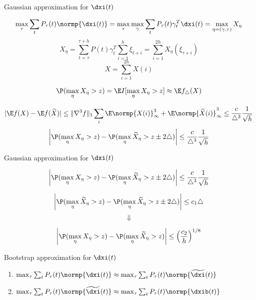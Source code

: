 \documentclass[9pt,english]{beamer}   %
\begin{document}
\begin{frame}{Gaussian approximation for $\dxi(t)$}

\[
\max_\tau \sum_t P_\tau(t)  \normp{\dxi(t)}  =
\max_\tau \max_{\gamma} \sum_t P_\tau(t) \gamma_t^{T}  \dxi(t) 
 = \max_{\eta = (\gamma, \tau)} X_{\eta} 
\]
\[
 X_{\eta}  = \sum_{t = \tau}^{\tau + h} P(t) \gamma_t^{T} \sum_{i = 1}^{ h} \xi_{t+i}
   = \sum_{i = 1}^{2h} X_{\eta}(\xi_{\tau +  i})   
\]
\[
X = \sum_{i = 1}^{2h} X(i)
\]

\[
\P (\max_{\eta} X_{\eta} > z) = \E I [ \max_{\eta} X_{\eta} > z ] 
\approx
 \E f_{\triangle} (X)
\]

\[
| \E f(X) - \E f(\widetilde{X}) | \leq  \| \nabla^3 f \|_1 \sum_i \E \normp{X(i)}^3_{\infty} + \E \normp{\widetilde{X}(i)}^3_{\infty} 
\leq
\frac{c}{\triangle^3} \frac{1}{\sqrt{h}} 
\]
\[
\left | \P (\max_{\eta} X_{\eta} > z)   -  \P (\max_{\eta} \widetilde{X}_{\eta} > z \pm 2 \triangle) \right | 
\leq
\frac{c}{\triangle^3} \frac{1}{\sqrt{h}} 
\]

\end{frame}

\begin{frame}{Gaussian approximation for $\dxi(t)$}

\[
\left | \P (\max_{\eta} X_{\eta} > z)   -  \P (\max_{\eta} \widetilde{X}_{\eta} > z \pm 2 \triangle) \right | 
\leq
\frac{c}{\triangle^3} \frac{1}{\sqrt{h}} 
\]

\[
\left | \P (\max_{\eta} \widetilde{X}_{\eta} > z)   -  \P (\max_{\eta} \widetilde{X}_{\eta} > z \pm 2 \triangle) \right | 
\leq c_1 \triangle 
\]
\[
\Downarrow
\]

\[
\left | \P (\max_{\eta} X_{\eta} > z)   -  \P (\max_{\eta} \widetilde{X}_{\eta} > z ) \right | 
\leq
 \left( \frac{c_2}{h} \right)^{1/8} 
\]

\end{frame}


\begin{frame}{Bootstrap approximation for $\dxi(t)$}



\begin{enumerate}
\item $\max_\tau \sum_t P_\tau(t)  \normp{\dxi(t)} \approx \max_\tau \sum_t P_\tau(t)  \normp{\widetilde{\dxi}(t)}$ 
\item $\max_\tau \sum_t P_\tau(t)  \normp{\widetilde{\dxi}(t)} \approx \max_\tau \sum_t P_\tau(t)  \normp{{\dxib}(t)}$ 
\end{enumerate}

\end{frame}
\end{document}
